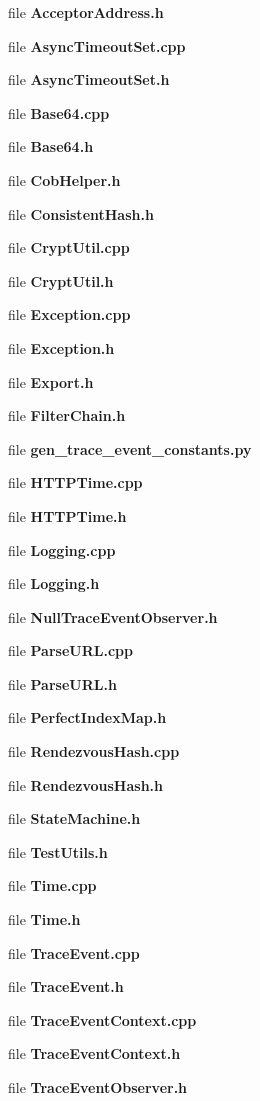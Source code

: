 \begin{DoxyCompactItemize}
\item 
file {\bf Acceptor\+Address.\+h}
\item 
file {\bf Async\+Timeout\+Set.\+cpp}
\item 
file {\bf Async\+Timeout\+Set.\+h}
\item 
file {\bf Base64.\+cpp}
\item 
file {\bf Base64.\+h}
\item 
file {\bf Cob\+Helper.\+h}
\item 
file {\bf Consistent\+Hash.\+h}
\item 
file {\bf Crypt\+Util.\+cpp}
\item 
file {\bf Crypt\+Util.\+h}
\item 
file {\bf Exception.\+cpp}
\item 
file {\bf Exception.\+h}
\item 
file {\bf Export.\+h}
\item 
file {\bf Filter\+Chain.\+h}
\item 
file {\bf gen\+\_\+trace\+\_\+event\+\_\+constants.\+py}
\item 
file {\bf H\+T\+T\+P\+Time.\+cpp}
\item 
file {\bf H\+T\+T\+P\+Time.\+h}
\item 
file {\bf Logging.\+cpp}
\item 
file {\bf Logging.\+h}
\item 
file {\bf Null\+Trace\+Event\+Observer.\+h}
\item 
file {\bf Parse\+U\+R\+L.\+cpp}
\item 
file {\bf Parse\+U\+R\+L.\+h}
\item 
file {\bf Perfect\+Index\+Map.\+h}
\item 
file {\bf Rendezvous\+Hash.\+cpp}
\item 
file {\bf Rendezvous\+Hash.\+h}
\item 
file {\bf State\+Machine.\+h}
\item 
file {\bf Test\+Utils.\+h}
\item 
file {\bf Time.\+cpp}
\item 
file {\bf Time.\+h}
\item 
file {\bf Trace\+Event.\+cpp}
\item 
file {\bf Trace\+Event.\+h}
\item 
file {\bf Trace\+Event\+Context.\+cpp}
\item 
file {\bf Trace\+Event\+Context.\+h}
\item 
file {\bf Trace\+Event\+Observer.\+h}

\end{DoxyCompactItemize}
